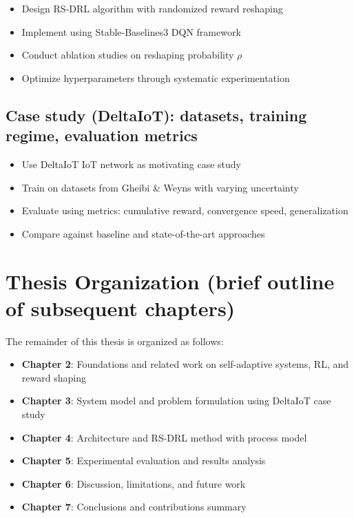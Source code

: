 \documentclass[11pt,a4paper]{article}
\begin{document}
\begin{itemize}
    \item Design RS-DRL algorithm with randomized reward reshaping
    \item Implement using Stable-Baselines3 DQN framework
    \item Conduct ablation studies on reshaping probability $\rho$
    \item Optimize hyperparameters through systematic experimentation
\end{itemize}

\subsection{Case study (DeltaIoT): datasets, training regime, evaluation metrics}

\begin{itemize}
    \item Use DeltaIoT IoT network as motivating case study
    \item Train on datasets from Gheibi \& Weyns with varying uncertainty
    \item Evaluate using metrics: cumulative reward, convergence speed, generalization
    \item Compare against baseline and state-of-the-art approaches
\end{itemize}

\section{Thesis Organization (brief outline of subsequent chapters)}

The remainder of this thesis is organized as follows:

\begin{itemize}
    \item \textbf{Chapter 2}: Foundations and related work on self-adaptive systems, RL, and reward shaping
    \item \textbf{Chapter 3}: System model and problem formulation using DeltaIoT case study
    \item \textbf{Chapter 4}: Architecture and RS-DRL method with process model
    \item \textbf{Chapter 5}: Experimental evaluation and results analysis
    \item \textbf{Chapter 6}: Discussion, limitations, and future work
    \item \textbf{Chapter 7}: Conclusions and contributions summary
\end{itemize}
\end{document}
